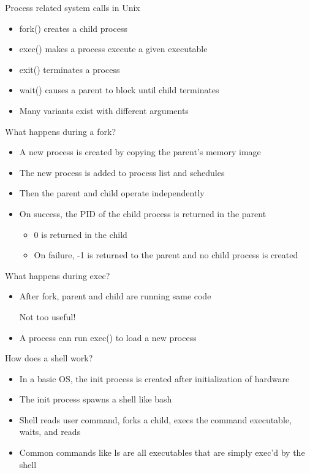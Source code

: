 \documentclass[12pt]{article}
\begin{document}
Process related system calls in Unix
\begin{itemize}
    \item fork() creates a child process
    \item exec() makes a process execute a given executable
    \item exit() terminates a process
    \item wait() causes a parent to block until child terminates
    \item Many variants exist with different arguments
\end{itemize}

What happens during a fork?
\begin{itemize}
    \item A new process is created by copying the parent's memory image
    \item The new process is added to process list and schedules
    \item Then the parent and child operate independently
    \item On success, the PID of the child process is returned in the parent
    \begin{itemize}
        \item 0 is returned in the child
        \item On failure, -1 is returned to the parent and no child process is created
    \end{itemize}
\end{itemize}

What happens during exec?
\begin{itemize}
    \item After fork, parent and child are running same code
    
    Not too useful!
    
    \item A process can run exec() to load a new process 
\end{itemize}

How does a shell work?
\begin{itemize}
    \item In a basic OS, the init process is created after initialization of hardware
    \item The init process spawns a shell like bash
    \item Shell reads user command, forks a child, execs the command executable, waits, and reads
    \item Common commands like ls are all executables that are simply exec'd by the shell
\end{itemize}
\end{document}
